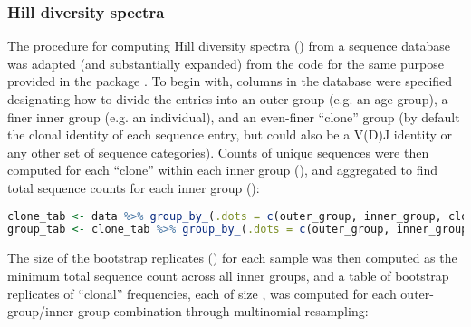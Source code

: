 \subsubsection{Hill diversity spectra}
\label{sec:methods_comp_igdownstream_spectra}

The procedure for computing Hill diversity spectra () from a  sequence database was adapted (and substantially expanded) from the code for the same purpose provided in the  package  \parencite{gupta2015changeo,stern2014bcells}. To begin with, columns in the database were specified designating how to divide the entries into an outer group (e.g. an age group), a finer inner group (e.g. an individual), and an even-finer ``clone'' group (by default the clonal identity of each sequence entry, but could also be a V(D)J identity or any other set of sequence categories). Counts of unique sequences were then computed for each ``clone'' within each inner group (), and aggregated to find total sequence counts for each inner group ():

\begin{lstlisting}[language=R]
clone_tab <- data %>% group_by_(.dots = c(outer_group, inner_group, clone_field)) %>% dplyr::summarize(COUNT = n())
group_tab <- clone_tab %>% group_by_(.dots = c(outer_group, inner_group)) %>% dplyr::summarize_(SEQUENCES = interp(~sum(x, na.rm = TRUE), x = as.name("COUNT")))
\end{lstlisting}

\noindent The size of the bootstrap replicates () for each sample was then computed as the minimum total sequence count across all inner groups, and a table of  bootstrap replicates of ``clonal'' frequencies, each of size , was computed for each outer-group/inner-group combination through multinomial resampling:

